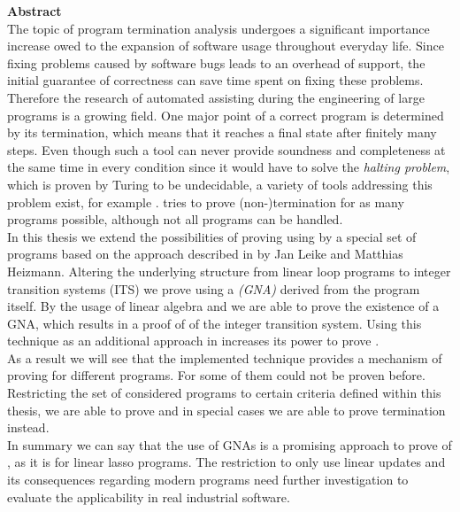 {\bf\Large Abstract} \\ [1em] 

The topic of program termination analysis undergoes a significant importance increase owed to the expansion of software usage throughout everyday life. Since fixing problems caused by software bugs leads to an overhead of support, the initial guarantee of correctness can save time spent on fixing these problems. Therefore the research of automated assisting during the engineering of large programs is a growing field.
One major point of a correct program is determined by its termination, which means that it reaches a final state after finitely many steps. Even though such a tool can never provide soundness and completeness at the same time in every condition since it would have to solve the \textit{halting problem}, which is proven by Turing to be undecidable, a variety of tools addressing this problem exist, for example \aprove. \aprove tries to prove (non-)termination for as many programs possible, although not all programs can be handled.\newline \\
In this thesis we extend the possibilities of proving \nonterm using \aprove by a special set of programs based on the approach described in \cite{leike2014geometric} by Jan Leike and Matthias Heizmann. Altering the underlying structure from linear loop programs to integer transition systems (ITS) we prove \nonterm using a \textit{\gna (GNA)} derived from the program itself. By the usage of linear algebra and \solver we are able to prove the existence of a GNA, which results in a proof of \nonterm of the integer transition system. Using this technique as an additional approach in \aprove increases its power to prove \nonterm. 
\\
As a result we will see that the implemented technique provides a mechanism of proving \nonterm for different programs. For some of them \nonterm could not be proven before. Restricting the set of considered programs to certain criteria defined within this thesis, we are able to prove \nonterm and in special cases we are able to prove termination instead. \newline
\\
In summary we can say that the use of GNAs is a promising approach to prove \nonterm of \itss, as it is for linear lasso programs. The restriction to only use linear updates and its consequences regarding modern programs need further investigation to evaluate the applicability in real industrial software.
